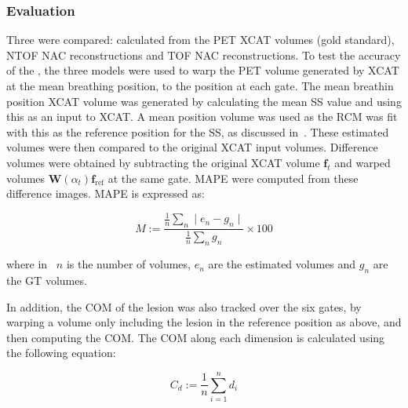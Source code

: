             \subsubsection{Evaluation} \label{sec:impact_of_tof_on_respiratory_motion_model_estimation_using_pre_gated_no_intra_cycle_motion_nac_pet_methods_evaluation}
                Three  were compared: calculated from the \gls{PET} \gls{XCAT} volumes (gold standard), \gls{NTOF} \gls{NAC} reconstructions and \gls{TOF} \gls{NAC} reconstructions. To test the accuracy of the , the three models were used to warp the \gls{PET} volume generated by \gls{XCAT} at the mean breathing position, to the position at each gate. The mean breathin position \gls{XCAT} volume was generated by calculating the mean \gls{SS} value and using this as an input to \gls{XCAT}. A mean position volume was used as the \gls{RCM} was fit with this as the reference position for the \gls{SS}, as discussed in~. These estimated volumes were then compared to the original \gls{XCAT} input volumes. Difference volumes were obtained by subtracting the original \gls{XCAT} volume $\mathbf{f}_t$ and warped volumes $\mathbf{W}(\alpha_t) \mathbf{f}_\mathrm{ref}$ at the same gate. \gls{MAPE} were computed from these difference images. \gls{MAPE} is expressed as:
                
                \begin{equation} \label{eq:impact_of_tof_on_respiratory_motion_model_estimation_using_pre_gated_no_intra_cycle_motion_nac_pet_methods_mape}
                   M := \frac{\frac{1}{n}\sum_{n}\mid e_n - g_n \mid}{\frac{1}{n}\sum_{n}g_n} \times 100
                \end{equation}
                
                \noindent where in~ $n$ is the number of volumes, $e_n$ are the estimated volumes and $g_n$ are the \gls{GT} volumes.
                
                In addition, the \gls{COM} of the lesion was also tracked over the six gates, by warping a volume only including the lesion in the reference position as above, and then computing the \gls{COM}. The \gls{COM} along each dimension is calculated using the following equation:
                
                \begin{equation} \label{eq:impact_of_tof_on_respiratory_motion_model_estimation_using_pre_gated_no_intra_cycle_motion_nac_pet_methods_com}
                   C_{d} := \frac{1}{n}\sum_{i=1}^{n} d_{i}
                \end{equation}
                
